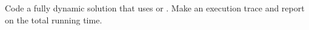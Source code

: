   Code a fully dynamic solution that uses  or .
  Make an execution trace and report on the total running time.
